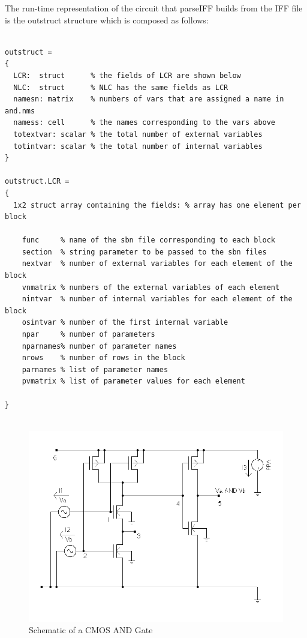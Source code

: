 \documentclass{scrartcl}
\let\tt=\normalfont\ttfamily
\newcommand{\Iff}{{\tt IFF}}
\begin{document}
The run-time representation of the circuit that {\tt parseIFF} builds
from the {\Iff} file is the {\tt outstruct} structure which is composed as follows:
\begin{lstlisting}

outstruct =
{
  LCR:  struct      % the fields of LCR are shown below
  NLC:  struct      % NLC has the same fields as LCR
  namesn: matrix    % numbers of vars that are assigned a name in and.nms
  namess: cell      % the names corresponding to the vars above
  totextvar: scalar % the total number of external variables
  totintvar: scalar % the total number of internal variables
}

outstruct.LCR =
{
  1x2 struct array containing the fields: % array has one element per block

    func     % name of the sbn file corresponding to each block
    section  % string parameter to be passed to the sbn files
    nextvar  % number of external variables for each element of the block
    vnmatrix % numbers of the external variables of each element
    nintvar  % number of internal variables for each element of the block
    osintvar % number of the first internal variable
    npar     % number of parameters
    nparnames% number of parameter names
    nrows    % number of rows in the block
    parnames % list of parameter names
    pvmatrix % list of parameter values for each element

}


\end{lstlisting}



\begin{figure}
\begin{center}
\includegraphics[width=.99\linewidth]{AND_BW.png}
\end{center}
\caption{Schematic of a CMOS AND Gate}\label{fig:and}
\end{figure}
\end{document}
